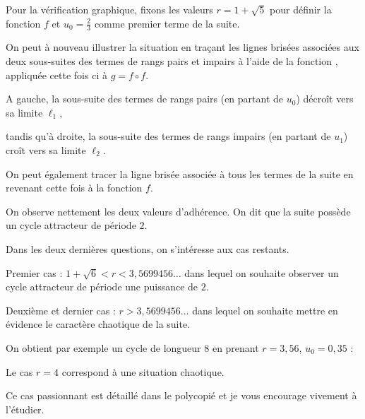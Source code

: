 Pour la vérification graphique, fixons les valeurs $r=1+\sqrt{5}$ pour définir la fonction $f$ et 
$u_0=\frac23$ comme premier terme de la suite.

On peut à nouveau  illustrer la situation en traçant les lignes 
brisées associées aux deux sous-suites des termes de rangs pairs 
et impairs à l'aide de la fonction , 
appliquée cette fois ci à $g=f\circ f$. 



A gauche, la sous-suite des termes de rangs pairs (en partant de $u_0$) décroît vers sa limite $\ell_1$, 


tandis qu'à droite, la sous-suite des termes de rangs impairs (en partant de $u_1$) croît vers sa limite $\ell_2$. 


\change

On peut également tracer la ligne brisée associée à tous les termes de la suite 
en revenant cette fois à la fonction $f$.

On observe nettement les deux valeurs d'adhérence. 
On dit que la suite  possède un cycle attracteur de période $2$.


\diapo
Dans les deux dernières questions, on s'intéresse aux cas restants.

Premier cas : $1+\sqrt{6}<r<3, 5699456\ldots$ dans lequel on souhaite observer un cycle attracteur de période une puissance de $2$.

Deuxième et dernier cas : $r > 3, 5699456\ldots$ dans lequel on souhaite mettre en évidence le caractère chaotique de la suite.

\diapo

On obtient par exemple un cycle de longueur $8$ en prenant $r=3,56$, $u_0=0,35$ :

\change

Le cas $r=4$ correspond à une situation chaotique.

Ce cas passionnant est détaillé dans le polycopié et je vous encourage vivement 
à l'étudier.


